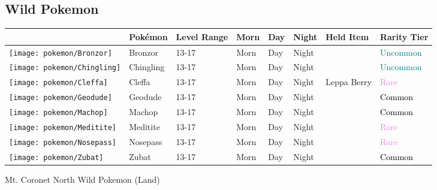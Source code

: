 \subsection{Wild Pokemon}%
\label{subsec:WildPokemon}%
\begin{longtable}{||l l l l l l l l||}%
\hline%
&Pokémon&Level Range&Morn&Day&Night&Held Item&Rarity Tier\\%
\hline%
\endhead%
\hline%
\texttt{[image: pokemon/Bronzor]}&Bronzor&13{-}17&Morn&Day&Night&&\textcolor{teal}{%
Uncommon%
}\\%
\hline%
\texttt{[image: pokemon/Chingling]}&Chingling&13{-}17&Morn&Day&Night&&\textcolor{teal}{%
Uncommon%
}\\%
\hline%
\texttt{[image: pokemon/Cleffa]}&Cleffa&13{-}17&Morn&Day&Night&Leppa Berry&\textcolor{violet}{%
Rare%
}\\%
\hline%
\texttt{[image: pokemon/Geodude]}&Geodude&13{-}17&Morn&Day&Night&&\textcolor{black}{%
Common%
}\\%
\hline%
\texttt{[image: pokemon/Machop]}&Machop&13{-}17&Morn&Day&Night&&\textcolor{black}{%
Common%
}\\%
\hline%
\texttt{[image: pokemon/Meditite]}&Meditite&13{-}17&Morn&Day&Night&&\textcolor{violet}{%
Rare%
}\\%
\hline%
\texttt{[image: pokemon/Nosepass]}&Nosepass&13{-}17&Morn&Day&Night&&\textcolor{violet}{%
Rare%
}\\%
\hline%
\texttt{[image: pokemon/Zubat]}&Zubat&13{-}17&Morn&Day&Night&&\textcolor{black}{%
Common%
}\\%
\hline%
\end{longtable}%
\caption{Mt. Coronet North Wild Pokemon (Land)}%
